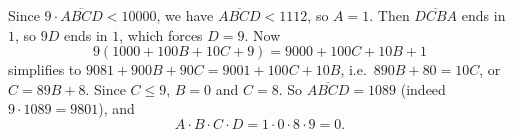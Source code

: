 Since $9\cdot\overline{ABCD}<10000$, we have $\overline{ABCD}<1112$, so $A=1$. Then $\overline{DCBA}$ ends in $1$, so $9D$ ends in $1$, which forces $D=9$. Now
\[
9(1000+100B+10C+9)=9000+100C+10B+1
\]
simplifies to $9081+900B+90C=9001+100C+10B$, i.e.\ $890B+80=10C$, or $C=89B+8$. Since $C\le9$, $B=0$ and $C=8$. So $\overline{ABCD}=1089$ (indeed $9\cdot1089=9801$), and
\[
A\cdot B\cdot C\cdot D=1\cdot0\cdot8\cdot9=\boxed{0}.
\]

